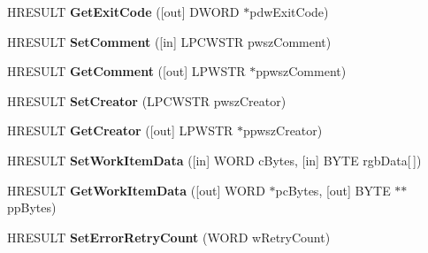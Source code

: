 \begin{DoxyCompactItemize}
\item 
\mbox{\label{interface_i_scheduled_work_item_a8f10752ab476d2f011e8928975828f6f}} 
H\+R\+E\+S\+U\+LT {\bfseries Get\+Exit\+Code} (\mbox{[}out\mbox{]} D\+W\+O\+RD $\ast$pdw\+Exit\+Code)
\item 
\mbox{\label{interface_i_scheduled_work_item_aca88114c23316d4ebb8ebccc442e8ed7}} 
H\+R\+E\+S\+U\+LT {\bfseries Set\+Comment} (\mbox{[}in\mbox{]} L\+P\+C\+W\+S\+TR pwsz\+Comment)
\item 
\mbox{\label{interface_i_scheduled_work_item_a23b8a16f14406186feb330bc5034c907}} 
H\+R\+E\+S\+U\+LT {\bfseries Get\+Comment} (\mbox{[}out\mbox{]} L\+P\+W\+S\+TR $\ast$ppwsz\+Comment)
\item 
\mbox{\label{interface_i_scheduled_work_item_ada3cb74813145f98fa24a2708f5c9501}} 
H\+R\+E\+S\+U\+LT {\bfseries Set\+Creator} (L\+P\+C\+W\+S\+TR pwsz\+Creator)
\item 
\mbox{\label{interface_i_scheduled_work_item_ab5bc2a241acb51cba21439b88d185863}} 
H\+R\+E\+S\+U\+LT {\bfseries Get\+Creator} (\mbox{[}out\mbox{]} L\+P\+W\+S\+TR $\ast$ppwsz\+Creator)
\item 
\mbox{\label{interface_i_scheduled_work_item_a9bacb4fe5724840a163a51fa2a56eeb0}} 
H\+R\+E\+S\+U\+LT {\bfseries Set\+Work\+Item\+Data} (\mbox{[}in\mbox{]} W\+O\+RD c\+Bytes, \mbox{[}in\mbox{]} B\+Y\+TE rgb\+Data\mbox{[}$\,$\mbox{]})
\item 
\mbox{\label{interface_i_scheduled_work_item_a7fce452e785ce19c38af3c2154692861}} 
H\+R\+E\+S\+U\+LT {\bfseries Get\+Work\+Item\+Data} (\mbox{[}out\mbox{]} W\+O\+RD $\ast$pc\+Bytes, \mbox{[}out\mbox{]} B\+Y\+TE $\ast$$\ast$pp\+Bytes)
\item 
\mbox{\label{interface_i_scheduled_work_item_af8f45e30fe3acd37e1fe8e38d71a2e64}} 
H\+R\+E\+S\+U\+LT {\bfseries Set\+Error\+Retry\+Count} (W\+O\+RD w\+Retry\+Count)
\item 
\mbox{\label{interface_i_scheduled_work_item_a4d6f0255f1465d8d4beb0eaa79396667}} 
$$
\end{DoxyCompactItemize}
